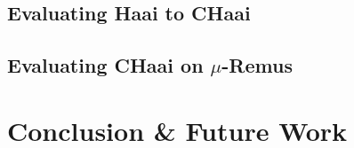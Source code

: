 \documentclass[a4paper]{book}
\begin{document}
\section{Evaluating Haai to CHaai}
\label{sec:evaluating-haai-to-chaai}
\section{Evaluating CHaai on $\mu$-Remus}
\label{sec:evaluating-chaai-on-mu-remus}
\chapter{Conclusion \& Future Work}
\label{ch:conclusion-and-future-work}
\backmatter%







\printbibliography%
\end{document}
